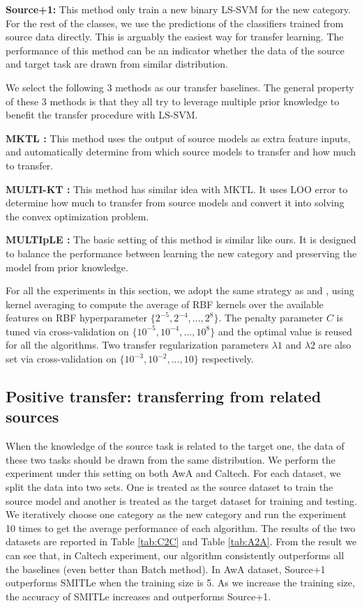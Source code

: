 \textbf{Source+1:} This method only train a new binary LS-SVM for the new category. For the rest of the classes, we use the predictions of the classifiers trained from source data directly. This is arguably the easiest way for transfer learning. The performance of this method can be an indicator whether the data of the source and target task are drawn from similar distribution.

We select the following 3 methods as our transfer baselines. The general property of these 3 methods is that they all try to leverage multiple prior knowledge to benefit the transfer procedure with LS-SVM.

\textbf{MKTL \cite{jie2011multiclass}:} This method uses the output of source models as extra feature inputs, and automatically determine from which source models to transfer and how much to transfer.


\textbf{MULTI-KT \cite{tommasi2014learning}:} This method has similar idea with MKTL. It uses LOO error to determine how much to transfer from source models and convert it into solving the convex optimization problem.

\textbf{MULTIpLE \cite{kuzborskij2013n}:} The basic setting of this method is similar like ours. It is designed to balance the performance between learning the new category and preserving the model from prior knowledge.

For all the experiments in this section, we adopt the same strategy as \cite{kuzborskij2013n} and \cite{tommasi2014learning}, using kernel averaging \cite{gehler2009feature} to compute the average of RBF kernels over the available features on RBF hyperparameter $\{2^{-5},2^{-4},...,2^8\}$. The penalty parameter $C$ is tuned via cross-validation on $\{10^{-5},10^{-4},...,10^8\}$ and the optimal value is reused for all the algorithms.
Two transfer regularization parameters $\lambda1$ and $\lambda2$ are also set via cross-validation on $\{10^{-3},10^{-2},...,10\}$ respectively.

\subsection{Positive transfer: transferring from related sources}
When the knowledge of the source task is related to the target one, the data of these two tasks should be drawn from the same distribution. 
We perform the experiment under this setting on both AwA and Caltech. For each dataset, we split the data into two sets. One is treated as the source dataset to train the source model and another is treated as the target dataset for training and testing. We iteratively choose one category as the new category and run the experiment 10 times to get the average performance of each algorithm. The results of the two datasets are reported in Table \ref{tab:C2C} and Table \ref{tab:A2A}. From the result we can see that, in Caltech experiment, our algorithm consistently outperforms all the baselines (even better than Batch method). In AwA dataset, Source+1 outperforms SMITLe when the training size is 5. As we increase the training size, the accuracy of SMITLe increases and outperforms Source+1.

